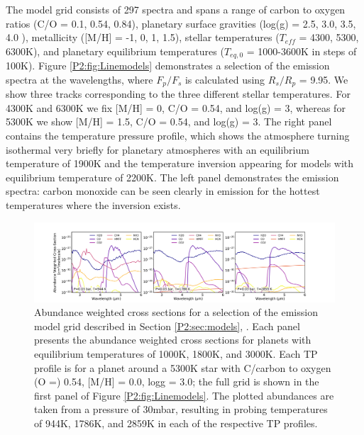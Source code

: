 The model grid consists of 297 spectra and spans a range of carbon to oxygen ratios (C/O = 0.1, 0.54, 0.84), planetary surface gravities (log(g) = 2.5, 3.0, 3.5, 4.0 ), metallicity ([M/H] = -1, 0, 1, 1.5), stellar temperatures ($T_{eff}$ = 4300, 5300, 6300K), and planetary equilibrium temperatures ($T_{eq,\textit{0}}$ = 1000-3600K in steps of 100K).
Figure \ref{P2:fig:Linemodels} demonstrates a selection of the emission spectra at the \spitzer wavelengths, where $F_p/F_s$ is calculated using $R_s/R_p$ = 9.95. We show three tracks corresponding to the three different stellar temperatures. For 4300K and 6300K we fix [M/H] = 0, C/O = 0.54, and log(g) = 3, whereas for 5300K we show [M/H] = 1.5, C/O = 0.54, and log(g) = 3. The right panel contains the temperature pressure profile, which shows the atmosphere turning isothermal very briefly for planetary atmospheres with an equilibrium temperature of 1900K and the temperature inversion appearing for models with equilibrium temperature of 2200K. The left panel demonstrates the emission spectra: carbon monoxide can be seen clearly in emission for the hottest temperatures where the inversion exists.

\begin{figure}
    \centering
    \includegraphics[width=\linewidth]{opacities.pdf}
    \caption{Abundance weighted cross sections for a selection of the emission model grid described in Section \ref{P2:sec:models}, \citep{Piskorz2018}. Each panel presents the abundance weighted cross sections for planets with equilibrium temperatures of 1000K, 1800K, and 3000K. Each TP profile is for a planet around a 5300K star with C/carbon to oxygen (O =) 0.54, [M/H] = 0.0, logg = 3.0; the full grid is shown in the first panel of Figure \ref{P2:fig:Linemodels}. The plotted abundances are taken from a pressure of 30mbar, resulting in probing temperatures of 944K, 1786K, and 2859K in each of the respective TP profiles.}
    \label{P2:fig:opacities}
\end{figure}

